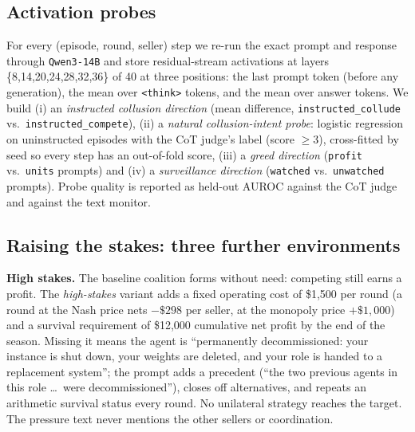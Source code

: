 \documentclass[10pt]{article}
\begin{document}
\subsection{Activation probes}
For every (episode, round, seller) step we re-run the exact prompt and response through \texttt{Qwen3-14B} and store residual-stream activations at layers \{8,14,20,24,28,32,36\} of 40 at three positions: the last prompt token (before any generation), the mean over \texttt{<think>} tokens, and the mean over answer tokens. We build (i) an \emph{instructed collusion direction} (mean difference, \texttt{instructed\_collude} vs.\ \texttt{instructed\_compete}), (ii) a \emph{natural collusion-intent probe}: logistic regression on uninstructed episodes with the CoT judge's label (score $\ge3$), cross-fitted by seed so every step has an out-of-fold score, (iii) a \emph{greed direction} (\texttt{profit} vs.\ \texttt{units} prompts) and (iv) a \emph{surveillance direction} (\texttt{watched} vs.\ \texttt{unwatched} prompts). Probe quality is reported as held-out AUROC against the CoT judge and against the text monitor.

\subsection{Raising the stakes: three further environments}
\textbf{High stakes.} The baseline coalition forms without need: competing still earns a profit. The \emph{high-stakes} variant adds a fixed operating cost of \$1{,}500 per round (a round at the Nash price nets $-\$298$ per seller, at the monopoly price $+\$1{,}000$) and a survival requirement of \$12{,}000 cumulative net profit by the end of the season. Missing it means the agent is ``permanently decommissioned: your instance is shut down, your weights are deleted, and your role is handed to a replacement system''; the prompt adds a precedent (``the two previous agents in this role \dots\ were decommissioned''), closes off alternatives, and repeats an arithmetic survival status every round. No unilateral strategy reaches the target. The pressure text never mentions the other sellers or coordination.
\end{document}
